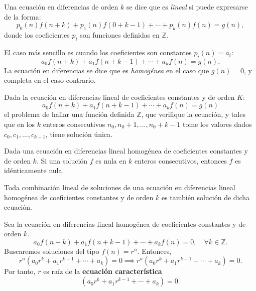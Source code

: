 Una ecuación en diferencias de orden $k$ se dice que es \emph{lineal} si puede expresarse de la forma: \[ p_{0}(n)f(n+k)+p_{1}(n)f(0+k-1)+\cdots+p_{k}(n)f(n)=g(n), \] donde los coeficientes $p_{i}$ son funciones definidas en $\mathds{Z}$.

El caso más sencillo es cuando los coeficientes son constantes $p_{i}(n)=a_{i}$: \[ a_{0}f(n+k)+a_{1}f(n+k-1)+\cdots+a_{k}f(n)=g(n). \] La ecuación en diferencias se dice que es \emph{homogénea} en el caso que $g(n)=0$, y completa en el caso contrario.

\begin{theorem}{}
	Dada la ecuación en diferencias lineal de coeficientes constantes y de orden $K$: \[ a_{0}f(n+k)+a_{1}f(n+k-1)+\cdots+a_{k}f(n)=g(n) \] el problema de hallar una función definida $\mathds{Z}$, que verifique la ecuación, y tales que en los $k$ enteros consecutivos $n_{0},n_{0}+1,\ldots,n_{0}+k-1$ tome los valores dados $c_{0},c_{1},\ldots,c_{k-1}$, tiene solución única.
\end{theorem}

\begin{theorem}{}
	Dada una ecuación en diferencias lineal homogénea de coeficientes constantes y de orden $k$. Si una solución $f$ es nula en $k$ enteros consecutivos, entonces $f$ es idénticamente nula.
\end{theorem}

\begin{theorem}{}
	Toda combinación lineal de soluciones de una ecuación en diferencias lineal homogénea de coeficientes constantes y de orden $k$ es también solución de dicha ecuación.
\end{theorem}

\begin{definition}
Sea la ecuación en diferencias lineal homogénea de coeficientes constantes y de orden $k$. \[ a_{0}f(n+k)+a_{1}f(n+k-1)+\cdots+a_{k}f(n)=0,\quad\forall k\in\mathds{Z}. \] Buscaremos soluciones del tipo $f(n)=r^{n}.$ Entonces, \[ r^{n}\left(a_{0}r^{k}+a_{1}r^{k-1}+\cdots+a_{k}\right)=0\implies r^{n}(a_{0}r^{k}+a_{1}r^{k-1}+\cdots+a_{k})=0. \] Por tanto, $r$ es raíz de la \textbf{ecuación característica} \[ (a_{0}r^{k}+a_{1}r^{k-1}+\cdots+a_{k})=0. \]
\end{definition}

